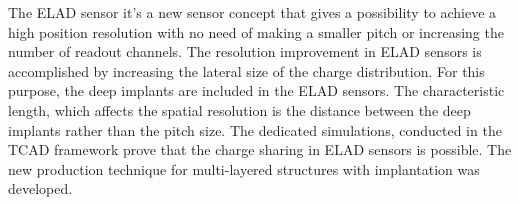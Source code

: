 
The ELAD sensor it's a new sensor concept that gives a possibility to achieve a high position resolution with no need of making a smaller pitch or increasing the number of readout channels. 
The resolution improvement in ELAD sensors is accomplished by increasing the lateral size of the charge distribution. 
For this purpose, the deep implants are included in the ELAD sensors. 
The characteristic length, which affects the spatial resolution is the distance between the deep implants rather than the pitch size. 
The dedicated simulations, conducted in the TCAD framework prove that the charge sharing in ELAD sensors is possible. 
The new production technique for multi-layered structures with implantation was developed. 
